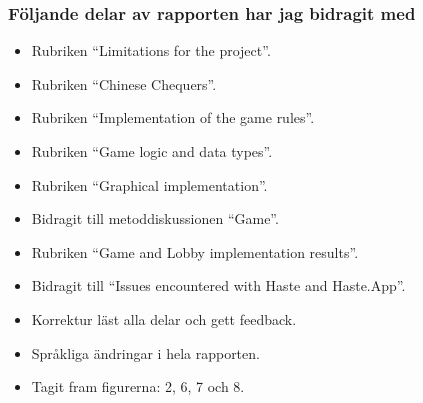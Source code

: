 \subsubsection{Följande delar av rapporten har jag bidragit med}
\begin{itemize}
    \item Rubriken “Limitations for the project”.
    \item Rubriken “Chinese Chequers”.
    \item Rubriken “Implementation of the game rules”.
    \item Rubriken “Game logic and data types”.
    \item Rubriken “Graphical implementation”.
    \item Bidragit till metoddiskussionen “Game”.
    \item Rubriken “Game and Lobby implementation results”.
    \item Bidragit till “Issues encountered with Haste and Haste.App”.
    \item Korrektur läst alla delar och gett feedback.
    \item Språkliga ändringar i hela rapporten.
    \item Tagit fram figurerna: 2, 6, 7 och 8.
\end{itemize}